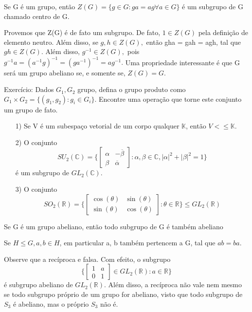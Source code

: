 \documentclass[algebra_notes.tex]{subfiles}
\begin{document}
\begin{def*}
	Se G é um grupo, então $Z(G) = \{g\in G: ga = ag\forall a\in{G}\} $ é um subgrupo de G chamado centro de G.
\end{def*}
Provemos que Z(G) é de fato um subgrupo. De fato, $1\in Z(G)$ pela definição de elemento neutro. Além disso, se $g, h\in Z(G),$
então gha = gah = agh, tal que $gh\in Z(G).$ Além disso, $g^{-1}\in Z(G),$ pois $g^{-1}a = (a^{-1}g)^{-1} = (ga^{-1})^{-1} = ag^{-1}.$
Uma propriedade interessante é que G será um grupo abeliano se, e somente se, $Z(G) = G.$
\begin{example*}
	Exercício: Dados $G_{1}, G_{2}$ grupo, defina o grupo produto como $G_{1}\times G_{2} = \{(g_{1}, g_{2}): g_{i}\in G_{i}\}$. Encontre
	uma operação que torne este conjunto um grupo de fato.
\end{example*}
\begin{example*}
	\begin{itemize}
		\item[1)]  Se V é um subespaço vetorial de um corpo qualquer $\mathbb{K}$, então $V<\leq{\mathbb{K}}$.
		\item[2)] O conjunto
		      $$
			      SU_{2}(\mathbb{C}) = \biggl\{ \begin{bmatrix}
				      \alpha & -\overline{\beta} \\
				      \beta  & \overline{\alpha}
			      \end{bmatrix}: \alpha, \beta \in \mathbb{C}, |\alpha|^{2} + |\beta|^{2} = 1\biggr\}
		      $$
		      é um subgrupo de $GL_{2}(\mathbb{C})$.
		\item[3)] O conjunto
		      $$
			      SO_{2}(\mathbb{R}) = \biggl\{\begin{bmatrix}
				      \cos{(\theta)} & \sin{(\theta)} \\
				      \sin{(\theta)} & \cos{(\theta)}
			      \end{bmatrix}: \theta\in \mathbb{R}\biggr\} \leq{GL_{2}(\mathbb{R})}
		      $$
	\end{itemize}
\end{example*}
\begin{prop*}
	Se G é um grupo abeliano, então todo subgrupo de G é também abeliano
\end{prop*}
\begin{proof*}
	Se $H\leq{G}, a, b\in H$, em particular a, b também pertencem a G, tal que $ab = ba.$ \qedsymbol
\end{proof*}
Observe que a recíproca e falsa. Com efeito, o subgrupo
$$
	\biggl\{\begin{bmatrix}
		1 & a \\
		0 & 1
	\end{bmatrix}\in GL_{2}(\mathbb{R}): a\in \mathbb{R}\biggr\}
$$
é subgrupo abeliano de $GL_{2}(\mathbb{R}).$ Além disso, a recíproca não vale nem mesmo se todo subgrupo próprio de um
grupo for abeliano, visto que todo subgrupo de $S_{3}$ é abeliano, mas o próprio $S_{3}$ não é.
\end{document}
